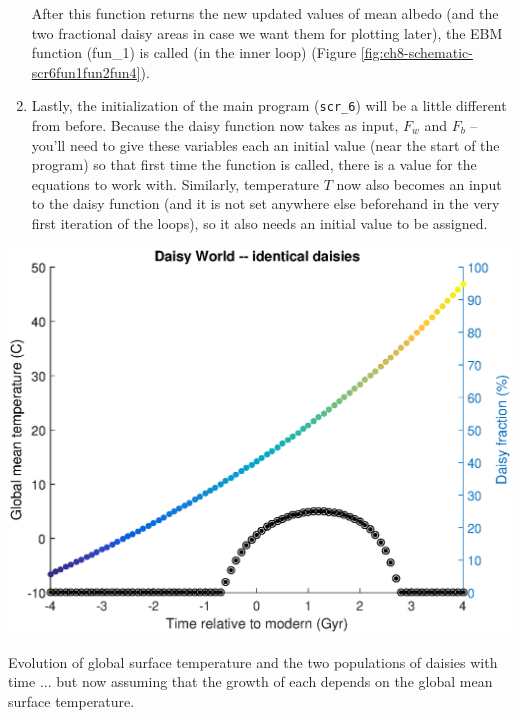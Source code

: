 \documentclass{tufte-book} %
\begin{document}
\begin{enumerate}
After this function returns the new updated values of mean albedo (and the two fractional daisy areas in case we want them for plotting later), the EBM function (\textsf{fun\_1}) is called (in the inner loop) (Figure \ref{fig:ch8-schematic-scr6fun1fun2fun4}).

\item Lastly, the initialization of the main program (\texttt{scr\_6}) will be a little different from before. Because the daisy function now takes as input, \(F_{w}\) and \(F_{b}\) -- you'll need to give these variables each an initial value (near the start of the program) so that first time the function is called, there is a value for the equations to work with. Similarly, temperature \(T\) now also becomes an input to the daisy function (and it is not set anywhere else beforehand in the very first iteration of the loops), so it also needs an initial value to be assigned.

\end{enumerate}

\begin{marginfigure}[-1.5in]
\includegraphics[width=\linewidth]{ch4-daisy-model2.eps}
\caption{Evolution of global surface temperature and the two populations of daisies with time ... but now assuming that the growth of each depends on the global mean surface temperature.}
\label{fig:ch4-daisy-model2}
\end{marginfigure}
\end{document}
